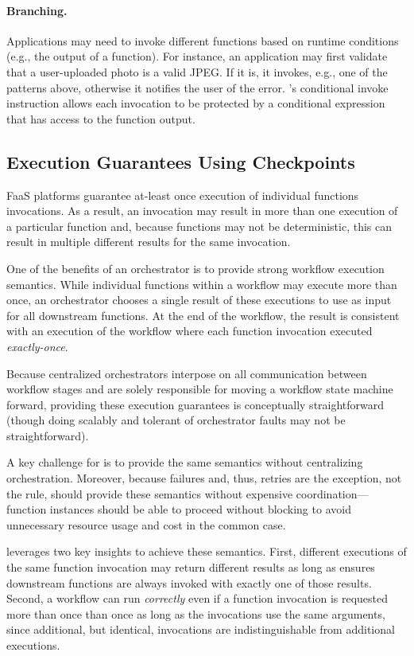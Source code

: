 \paragraph{Branching.}
Applications may need to invoke different functions based on runtime conditions
(e.g., the output of a function). For instance, an application may first
validate that a user-uploaded photo is a valid JPEG. If it is, it invokes, e.g.,
one of the patterns above, otherwise it notifies the user of the error.
\name{}'s conditional invoke instruction allows each invocation to be protected
by a conditional expression that has access to the function output.

\subsection{Execution Guarantees Using Checkpoints}\label{sec:design:execution}

FaaS platforms guarantee at-least once execution of individual functions
invocations. As a result, an invocation may result in more than one execution of
a particular function and, because functions may not be deterministic, this can
result in multiple different results for the same invocation.

One of the benefits of an orchestrator is to provide strong workflow execution
semantics. While individual functions within a workflow may execute more than
once, an orchestrator chooses a single result of these executions to use as
input for all downstream functions. At the end of the workflow, the result is
consistent with an execution of the workflow where each function invocation
executed \emph{exactly-once}.

Because centralized orchestrators interpose on all communication between
workflow stages and are solely responsible for moving a workflow state machine
forward, providing these execution guarantees is conceptually straightforward
(though doing scalably and tolerant of orchestrator faults may not be
straightforward).

A key challenge for \name{} is to provide the same semantics without
centralizing orchestration. Moreover, because failures and, thus, retries are
the exception, not the rule, \name{} should provide these semantics without
expensive coordination---function instances should be able to proceed without
blocking to avoid unnecessary resource usage and cost in the common case.

\name{} leverages two key insights to achieve these semantics.  First, different
executions of the same function invocation may return different results as long
as \name{} ensures downstream functions are always invoked with exactly one of
those results.  Second, a workflow can run \emph{correctly} even if a function
invocation is requested more than once than once as long as the invocations use
the same arguments, since additional, but identical, invocations are
indistinguishable from additional executions.

